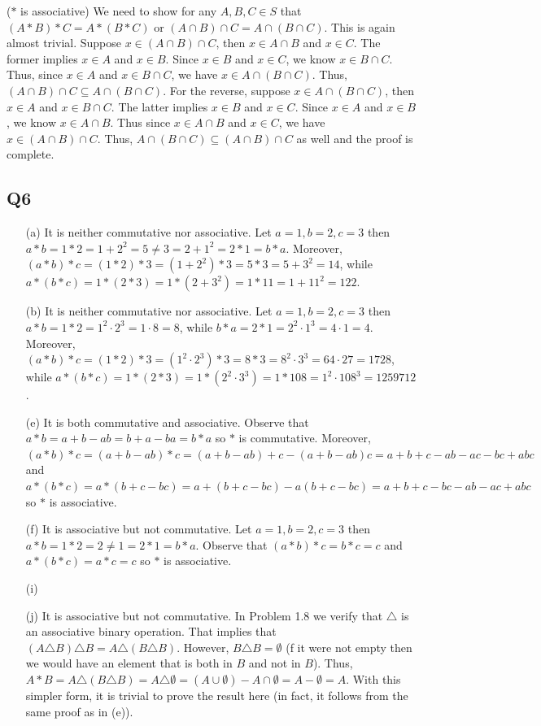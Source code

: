 \documentclass[12pt]{article}
\numberwithin{theorem}{section}
\numberwithin{equation}{section}
\numberwithin{remark}{section}
\numberwithin{definition}{section}
\numberwithin{theorem}{section}
\numberwithin{lemma}{section}
\numberwithin{example}{section}
\begin{document}
\vspace{\baselineskip}

\noindent ($*$ is associative) We need to show for any $A, B, C \in S$ that $(A * B) * C = A * (B * C)$ or $(A \cap B) \cap C = A \cap (B \cap C)$. This is again almost trivial. Suppose $x \in (A \cap B) \cap C$, then $x \in A \cap B$ and $x \in C$. The former implies $x \in A$ and $x \in B$. Since $x \in B$ and $x \in C$, we know $x \in B \cap C$. Thus, since $x \in A$ and $x \in B \cap C$, we have $x \in A \cap (B \cap C)$. Thus, $(A \cap B) \cap C \subseteq A \cap (B \cap C)$. For the reverse, suppose $x \in A \cap (B \cap C)$, then $x \in A$ and $x \in B \cap C$. The latter implies $x \in B$ and $x \in C$. Since $x \in A$ and $x \in B$, we know $x \in A \cap B$. Thus since $x \in A \cap B$ and $x \in C$, we have $x \in (A \cap B) \cap C$. Thus, $A \cap (B \cap C) \subseteq (A \cap B) \cap C$ as well and the proof is complete. 



\subsection{Q6}



\begin{itemize}
	\item[(a)]{It is neither commutative nor associative. Let $a=1, b=2, c=3$ then $a*b=1*2=1+2^2=5\neq3=2+1^2=2*1=b*a$. Moreover, $(a*b)*c=(1*2)*3=(1+2^2)*3=5*3=5+3^2=14$, while $a*(b*c)=1*(2*3)=1*(2+3^2)=1*11=1+11^2=122$.}
	\item[(b)]{It is neither commutative nor associative. Let $a=1, b=2, c=3$ then $a*b=1*2=1^2\cdot2^3=1\cdot8=8$, while $b*a=2*1=2^2\cdot1^3=4\cdot1=4$. Moreover, $(a*b)*c=(1*2)*3=(1^2\cdot2^3)*3=8*3=8^2\cdot3^3=64\cdot27=1728$, while $a*(b*c)=1*(2*3)=1*(2^2\cdot3^3)=1*108=1^2\cdot108^3=1259712$.}
	\item[(e)]{It is both commutative and associative. Observe that $a*b=a+b-ab=b+a-ba=b*a$ so $*$ is commutative. Moreover, $(a*b)*c=(a+b-ab)*c=(a+b-ab)+c-(a+b-ab)c=a+b+c-ab-ac-bc+abc$ and $a*(b*c)=a*(b+c-bc)=a+(b+c-bc)-a(b+c-bc)=a+b+c-bc-ab-ac+abc$ so $*$ is associative.}
	\item[(f)]{It is associative but not commutative. Let $a=1, b=2, c=3$ then $a*b=1*2=2\neq 1 = 2*1=b*a$. Observe that $(a*b)*c=b*c=c$ and $a*(b*c)=a*c=c$ so $*$ is associative.}
	\item[(i)]{}
	\item[(j)]{It is associative but not commutative. In Problem 1.8 we verify that $\triangle$ is an associative binary operation. That implies that $(A\triangle B)\triangle B=A\triangle (B \triangle B)$. However, $B \triangle B= \emptyset$ (f it were not empty then we would have an element that is both in $B$ and not in $B$). Thus, $A*B=A\triangle (B \triangle B)=A \triangle \emptyset = (A\cup \emptyset)-A\cap\emptyset=A-\emptyset=A$. With this simpler form, it is trivial to prove the result here (in fact, it follows from the same proof as in (e)).}
\end{itemize}
\end{document}
